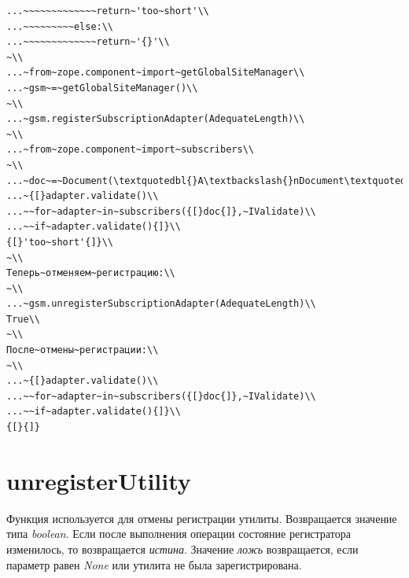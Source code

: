 \documentclass[a4paper,openany,twoside,draft]{book}
\providecommand*{\DUroletitlereference}[1]{\textsl{#1}}
\begin{document}
\begin{verbatim}
...~~~~~~~~~~~~~return~'too~short'\\
...~~~~~~~~~else:\\
...~~~~~~~~~~~~~return~'{}'\\
~\\
...~from~zope.component~import~getGlobalSiteManager\\
...~gsm~=~getGlobalSiteManager()\\
~\\
...~gsm.registerSubscriptionAdapter(AdequateLength)\\
~\\
...~from~zope.component~import~subscribers\\
~\\
...~doc~=~Document(\textquotedbl{}A\textbackslash{}nDocument\textquotedbl{},~\textquotedbl{}blah\textquotedbl{})\\
...~{[}adapter.validate()\\
...~~for~adapter~in~subscribers({[}doc{]},~IValidate)\\
...~~if~adapter.validate(){]}\\
{[}'too~short'{]}\\
~\\
Теперь~отменяем~регистрацию:\\
~\\
...~gsm.unregisterSubscriptionAdapter(AdequateLength)\\
True\\
~\\
После~отмены~регистрации:\\
~\\
...~{[}adapter.validate()\\
...~~for~adapter~in~subscribers({[}doc{]},~IValidate)\\
...~~if~adapter.validate(){]}\\
{[}{]}
\end{verbatim}


\section*{unregisterUtility%
  \label{unregisterutility}%
}

Функция используется для отмены регистрации утилиты.  Возвращается
значение типа \DUroletitlereference{boolean}.  Если после выполнения операции состояние
регистратора изменилось, то возвращается \DUroletitlereference{истина}.  Значение \DUroletitlereference{ложь}
возвращается, если параметр равен \DUroletitlereference{None} или утилита не была
зарегистрирована.
\end{document}
